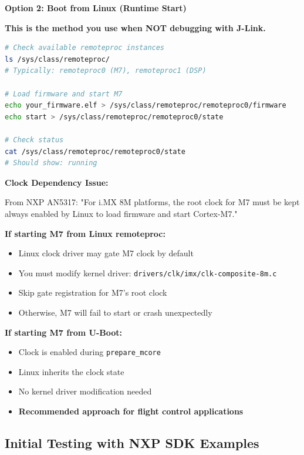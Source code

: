 \documentclass[12pt,a4paper]{report}
\begin{document}
\textbf{Option 2: Boot from Linux (Runtime Start)}

\textbf{This is the method you use when NOT debugging with J-Link.}

\begin{lstlisting}[language=bash]
# Check available remoteproc instances
ls /sys/class/remoteproc/
# Typically: remoteproc0 (M7), remoteproc1 (DSP)

# Load firmware and start M7
echo your_firmware.elf > /sys/class/remoteproc/remoteproc0/firmware
echo start > /sys/class/remoteproc/remoteproc0/state

# Check status
cat /sys/class/remoteproc/remoteproc0/state
# Should show: running
\end{lstlisting}

\begin{important}
\textbf{Clock Dependency Issue:}

From NXP AN5317: "For i.MX 8M platforms, the root clock for M7 must be kept always enabled by Linux to load firmware and start Cortex-M7."

\textbf{If starting M7 from Linux remoteproc:}
\begin{itemize}
    \item Linux clock driver may gate M7 clock by default
    \item You must modify kernel driver: \texttt{drivers/clk/imx/clk-composite-8m.c}
    \item Skip gate registration for M7's root clock
    \item Otherwise, M7 will fail to start or crash unexpectedly
\end{itemize}

\textbf{If starting M7 from U-Boot:}
\begin{itemize}
    \item Clock is enabled during \texttt{prepare\_mcore}
    \item Linux inherits the clock state
    \item No kernel driver modification needed
    \item \textbf{Recommended approach for flight control applications}
\end{itemize}
\end{important}

\subsection{Initial Testing with NXP SDK Examples}
\end{document}
